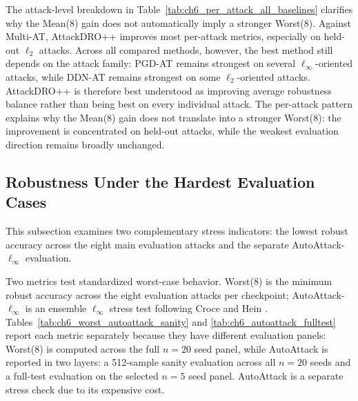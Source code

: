 The attack-level breakdown in Table~\ref{tab:ch6_per_attack_all_baselines} clarifies
why the Mean(8) gain does not automatically imply a stronger Worst(8). Against
Multi-AT, AttackDRO++ improves most per-attack metrics, especially on held-out
\(\ell_2\) attacks. Across all compared methods, however, the best method still
depends on the attack family: PGD-AT remains strongest on several
\(\ell_\infty\)-oriented attacks, while DDN-AT remains strongest on some
\(\ell_2\)-oriented attacks. AttackDRO++ is therefore best understood as
improving average robustness balance rather than being best on every individual
attack. The per-attack pattern explains why the Mean(8) gain does not translate
into a stronger Worst(8): the improvement is concentrated on held-out attacks,
while the weakest evaluation direction remains broadly unchanged.


\subsection{Robustness Under the Hardest Evaluation Cases}
\label{subsec:ch6_hardest_evaluation_cases}

This subsection examines two complementary stress indicators: the lowest robust accuracy across the eight main evaluation attacks and the separate AutoAttack-$\ell_\infty$ evaluation.

Two metrics test standardized worst-case behavior. Worst(8) is the minimum
robust accuracy across the eight evaluation attacks per checkpoint;
AutoAttack-$\ell_\infty$ is an ensemble $\ell_\infty$ stress test following
Croce and Hein \cite{croce2020reliable}. Tables~\ref{tab:ch6_worst_autoattack_sanity} and
\ref{tab:ch6_autoattack_fulltest} report each metric separately because they have
different evaluation panels: Worst(8) is computed across the full $n=20$
seed panel, while AutoAttack is reported in two layers: a 512-sample
sanity evaluation across all $n=20$ seeds and a full-test evaluation on
the selected $n=5$ seed panel. AutoAttack is a separate stress check due to its expensive cost.

